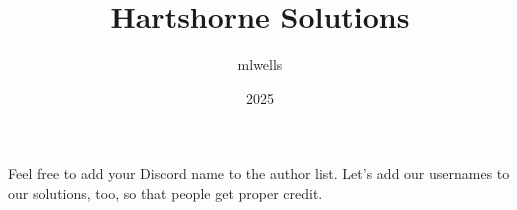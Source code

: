 \documentclass{article}
\title{Hartshorne Solutions}
\author{mlwells}
\date{2025}
\begin{document}
\maketitle
Feel free to add your Discord name to the author list.  Let's add our usernames to our solutions, too, so that people get proper credit.

\tableofcontents

\end{document}
